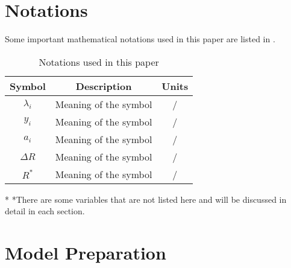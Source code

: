 \section{Notations}
Some important mathematical notations used in this paper are listed in . 
\begin{table}[H]
\begin{center}
\caption{Notations used in this paper}\label{tb:notations}
\begin{tabular}{c c c}
\toprule[2pt] %
\multicolumn{1}{m{1.5cm}}{\centering \textbf{Symbol}} %
&\multicolumn{1}{m{12.5cm}}{\centering\textbf{Description} }
&\multicolumn{1}{m{1cm}}{\centering \textbf{Units}}\\
\midrule
$\lambda_i$& Meaning of the symbol&/ \\
$y_i$& Meaning of the symbol&/\\
$a_i$& Meaning of the symbol&/\\
$\Delta R$&Meaning of the symbol&/ \\
$R^*$ &Meaning of the symbol &/\\
\bottomrule[2pt]
\end{tabular}

\begin{tablenotes}%
        \footnotesize
        \item[*] *There are some variables that are not listed here and will be discussed in detail in each section. %
\end{tablenotes}
\end{center}
\end{table}
\vspace{-1.2cm}%

\section{Model Preparation}
